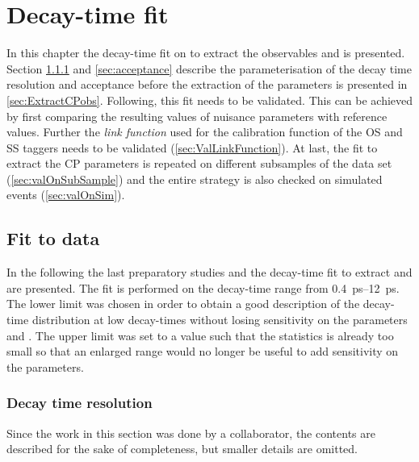 \chapter{Decay-time fit}

In this chapter the decay-time fit on \BdToDpi to extract the \CP observables \Sf and \Sfbar is presented.
Section \ref{sec:resolution} and \ref{sec:acceptance} describe the parameterisation of the decay time resolution and acceptance before the extraction of the \CP parameters is presented in \cref{sec:ExtractCPobs}.
Following, this fit needs to be validated.
This can be achieved by first comparing the resulting values of nuisance parameters with reference values.
Further the \emph{link function} used for the calibration function of the OS and SS taggers needs to be validated (\cref{sec:ValLinkFunction}).
At last, the fit to extract the CP parameters is repeated on different subsamples of the data set (\cref{sec:valOnSubSample}) and the entire strategy is also checked on simulated events (\cref{sec:valOnSim}).

\section{Fit to data}

In the following the last preparatory studies and the decay-time fit to extract \Sf and \Sfbar are presented.
The fit is performed on the decay-time range from \SIrange{0.4}{12}{\pico\second}.
The lower limit was chosen in order to obtain a good description of the decay-time distribution at low decay-times without losing sensitivity on the parameters \Sf and \Sfbar.
The upper limit was set to a value such that the statistics is already too small so that an enlarged range would no longer be useful to add sensitivity on the \CP parameters.

\subsection{Decay time resolution}
\label{sec:resolution}

Since the work in this section was done by a collaborator, the contents are described for the sake of completeness, but smaller details are omitted.

